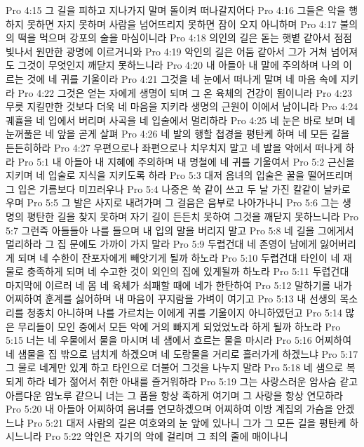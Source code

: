 Pro 4:15  그 길을 피하고 지나가지 말며 돌이켜 떠나갈지어다
Pro 4:16  그들은 악을 행하지 못하면 자지 못하며 사람을 넘어뜨리지 못하면 잠이 오지 아니하며
Pro 4:17  불의의 떡을 먹으며 강포의 술을 마심이니라
Pro 4:18  의인의 길은 돋는 햇볕 같아서 점점 빛나서 원만한 광명에 이르거니와
Pro 4:19  악인의 길은 어둠 같아서 그가 거쳐 넘어져도 그것이 무엇인지 깨닫지 못하느니라
Pro 4:20  내 아들아 내 말에 주의하며 나의 이르는 것에 네 귀를 기울이라
Pro 4:21  그것을 네 눈에서 떠나게 말며 네 마음 속에 지키라
Pro 4:22  그것은 얻는 자에게 생명이 되며 그 온 육체의 건강이 됨이니라
Pro 4:23  무릇 지킬만한 것보다 더욱 네 마음을 지키라 생명의 근원이 이에서 남이니라
Pro 4:24  궤휼을 네 입에서 버리며 사곡을 네 입술에서 멀리하라
Pro 4:25  네 눈은 바로 보며 네 눈꺼풀은 네 앞을 곧게 살펴
Pro 4:26  네 발의 행할 첩경을 평탄케 하며 네 모든 길을 든든히하라
Pro 4:27  우편으로나 좌편으로나 치우치지 말고 네 발을 악에서 떠나게 하라
Pro 5:1  내 아들아 내 지혜에 주의하며 내 명철에 네 귀를 기울여서
Pro 5:2  근신을 지키며 네 입술로 지식을 지키도록 하라
Pro 5:3  대저 음녀의 입술은 꿀을 떨어뜨리며 그 입은 기름보다 미끄러우나
Pro 5:4  나중은 쑥 같이 쓰고 두 날 가진 칼같이 날카로우며
Pro 5:5  그 발은 사지로 내려가며 그 걸음은 음부로 나아가나니
Pro 5:6  그는 생명의 평탄한 길을 찾지 못하며 자기 길이 든든치 못하여 그것을 깨닫지 못하느니라
Pro 5:7  그런즉 아들들아 나를 들으며 내 입의 말을 버리지 말고
Pro 5:8  네 길을 그에게서 멀리하라 그 집 문에도 가까이 가지 말라
Pro 5:9  두렵건대 네 존영이 남에게 잃어버리게 되며 네 수한이 잔포자에게 빼앗기게 될까 하노라
Pro 5:10  두렵건대 타인이 네 재물로 충족하게 되며 네 수고한 것이 외인의 집에 있게될까 하노라
Pro 5:11  두렵건대 마지막에 이르러 네 몸 네 육체가 쇠패할 때에 네가 한탄하여
Pro 5:12  말하기를 내가 어찌하여 훈계를 싫어하며 내 마음이 꾸지람을 가벼이 여기고
Pro 5:13  내 선생의 목소리를 청종치 아니하며 나를 가르치는 이에게 귀를 기울이지 아니하였던고
Pro 5:14  많은 무리들이 모인 중에서 모든 악에 거의 빠지게 되었었노라 하게 될까 하노라
Pro 5:15  너는 네 우물에서 물을 마시며 네 샘에서 흐르는 물을 마시라
Pro 5:16  어찌하여 네 샘물을 집 밖으로 넘치게 하겠으며 네 도랑물을 거리로 흘러가게 하겠느냐
Pro 5:17  그 물로 네게만 있게 하고 타인으로 더불어 그것을 나누지 말라
Pro 5:18  네 샘으로 복되게 하라 네가 젊어서 취한 아내를 즐거워하라
Pro 5:19  그는 사랑스러운 암사슴 같고 아름다운 암노루 같으니 너는 그 품을 항상 족하게 여기며 그 사랑을 항상 연모하라
Pro 5:20  내 아들아 어찌하여 음녀를 연모하겠으며 어찌하여 이방 계집의 가슴을 안겠느냐
Pro 5:21  대저 사람의 길은 여호와의 눈 앞에 있나니 그가 그 모든 길을 평탄케 하시느니라
Pro 5:22  악인은 자기의 악에 걸리며 그 죄의 줄에 매이나니
